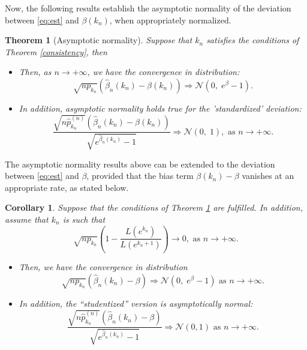 \documentclass[sn-mathphys-ay]{sn-jnl}%
\newtheorem{theorem}{Theorem}[section]%
\newtheorem{corollary}{Corollary}[section]
\begin{document}
Now, the following results establish the asymptotic normality of the deviation between
\eqref{eq:est} and $\beta(k_n)$, when appropriately normalized.

\begin{theorem}[Asymptotic normality]\label{asymptotic_normality}
    Suppose that \(k_n\) satisfies the conditions of Theorem \ref{consistency}, then
    \begin{itemize}
        \item[(i)] Then, as $n\to +\infty$, we have the convergence in distribution:
              $$\sqrt {n p_{k_n}} \left(\widehat \beta_n ({k_n}) - \beta(k_n) \right) \Rightarrow \mathcal{N}\left(0,\; e^{\beta}-1\right).
              $$
        \item[(ii)]In addition, asymptotic normality holds true for the 'standardized' deviation:  $$\frac{{\sqrt {n\widehat p_{{k_n}}^{(n)}} \left( {{{\widehat \beta }_n}\left( {{k_n}} \right) - \beta \left( {{k_n}} \right)} \right)}}{{\sqrt {{e^{{{\widehat \beta }_n}\left( {{k_n}} \right)}} - 1} }}\Rightarrow \mathcal{N}\left( {0,\; 1} \right), \text{ as } n\to +\infty.$$
    \end{itemize}
\end{theorem}

The asymptotic normality results above can be extended to the deviation between
\eqref{eq:est} and $\beta$, provided that the bias term $\beta(k_n)-\beta$ vanishes at an
appropriate rate, as stated below.

\begin{corollary}\label{asymptotic_normality_real_value}
    Suppose that the conditions of Theorem \ref{asymptotic_normality} are fulfilled. In addition, assume that \(k_n\) is such that
    \begin{equation}\label{eq:cond1}
        \sqrt {np_{k_n}} \left( {1 - \frac{{L\left( {{e^{{k_n}}}} \right)}}{{L\left( {{e^{{k_n} + 1}}} \right)}}} \right) \to 0, \text{ as } n\to +\infty.
    \end{equation}
    \begin{itemize}
        \item[(i)]
              Then, we have the convergence in distribution
              \[\sqrt {np_{k_n}} \left( {\widehat \beta_n \left( {{k_n}} \right) - \beta } \right) \Rightarrow \mathcal{N}(0,\; e^\beta-1) \text{ as } n\rightarrow +\infty.\]
        \item[(ii)] In addition, the ``studentized'' version is asymptotically normal:
              \[\frac{{\sqrt {n\widehat p_{{k_n}}^{(n)}} \left( {{{\widehat \beta }_n}(k_n) - \beta } \right)}}{{\sqrt {{e^{{{\widehat \beta }_n}(k_n)}} - 1} }}\Rightarrow \mathcal{N}(0,1) \text{ as } n\to +\infty.\]
    \end{itemize}
\end{corollary}
\end{document}
